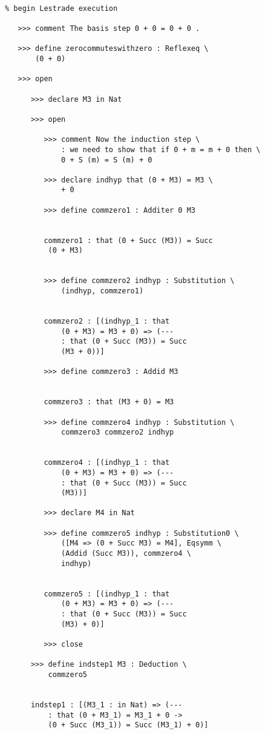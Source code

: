 \documentclass[12pt]{article}
\begin{document}
\begin{verbatim}

% begin Lestrade execution

   >>> comment The basis step 0 + 0 = 0 + 0 .

   >>> define zerocommuteswithzero : Reflexeq \
       (0 + 0)

   >>> open

      >>> declare M3 in Nat

      >>> open

         >>> comment Now the induction step \
             : we need to show that if 0 + m = m + 0 then \
             0 + S (m) = S (m) + 0

         >>> declare indhyp that (0 + M3) = M3 \
             + 0

         >>> define commzero1 : Additer 0 M3


         commzero1 : that (0 + Succ (M3)) = Succ 
          (0 + M3)


         >>> define commzero2 indhyp : Substitution \
             (indhyp, commzero1)


         commzero2 : [(indhyp_1 : that 
             (0 + M3) = M3 + 0) => (--- 
             : that (0 + Succ (M3)) = Succ 
             (M3 + 0))]

         >>> define commzero3 : Addid M3


         commzero3 : that (M3 + 0) = M3

         >>> define commzero4 indhyp : Substitution \
             commzero3 commzero2 indhyp


         commzero4 : [(indhyp_1 : that 
             (0 + M3) = M3 + 0) => (--- 
             : that (0 + Succ (M3)) = Succ 
             (M3))]

         >>> declare M4 in Nat

         >>> define commzero5 indhyp : Substitution0 \
             ([M4 => (0 + Succ M3) = M4], Eqsymm \
             (Addid (Succ M3)), commzero4 \
             indhyp)


         commzero5 : [(indhyp_1 : that 
             (0 + M3) = M3 + 0) => (--- 
             : that (0 + Succ (M3)) = Succ 
             (M3) + 0)]

         >>> close

      >>> define indstep1 M3 : Deduction \
          commzero5


      indstep1 : [(M3_1 : in Nat) => (--- 
          : that (0 + M3_1) = M3_1 + 0 -> 
          (0 + Succ (M3_1)) = Succ (M3_1) + 0)]


\end{verbatim}
\end{document}
